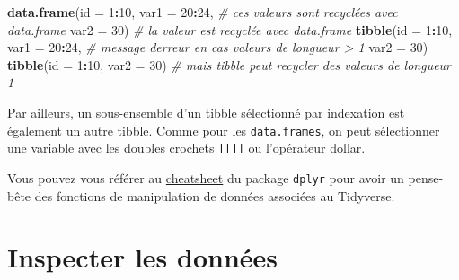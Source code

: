 \documentclass[
]{book}
\newenvironment{Shaded}{\begin{snugshade}}{\end{snugshade}}
\newcommand{\AttributeTok}[1]{\textcolor[rgb]{0.13,0.29,0.53}{#1}}
\newcommand{\CommentTok}[1]{\textcolor[rgb]{0.56,0.35,0.01}{\textit{#1}}}
\newcommand{\DecValTok}[1]{\textcolor[rgb]{0.00,0.00,0.81}{#1}}
\newcommand{\FunctionTok}[1]{\textcolor[rgb]{0.13,0.29,0.53}{\textbf{#1}}}
\newcommand{\NormalTok}[1]{#1}
\newcommand{\SpecialCharTok}[1]{\textcolor[rgb]{0.81,0.36,0.00}{\textbf{#1}}}
\begin{document}
\begin{Shaded}
\begin{Highlighting}[]
\FunctionTok{data.frame}\NormalTok{(}\AttributeTok{id =} \DecValTok{1}\SpecialCharTok{:}\DecValTok{10}\NormalTok{,}
           \AttributeTok{var1 =} \DecValTok{20}\SpecialCharTok{:}\DecValTok{24}\NormalTok{, }\CommentTok{\# ces valeurs sont recyclées avec data.frame}
           \AttributeTok{var2 =} \DecValTok{30}\NormalTok{) }\CommentTok{\# la valeur est recyclée avec data.frame}
\FunctionTok{tibble}\NormalTok{(}\AttributeTok{id =} \DecValTok{1}\SpecialCharTok{:}\DecValTok{10}\NormalTok{, }
       \AttributeTok{var1 =} \DecValTok{20}\SpecialCharTok{:}\DecValTok{24}\NormalTok{, }\CommentTok{\# message d\textquotesingle{}erreur en cas valeurs de longueur \textgreater{} 1}
       \AttributeTok{var2 =} \DecValTok{30}\NormalTok{)}
\FunctionTok{tibble}\NormalTok{(}\AttributeTok{id =} \DecValTok{1}\SpecialCharTok{:}\DecValTok{10}\NormalTok{, }
       \AttributeTok{var2 =} \DecValTok{30}\NormalTok{) }\CommentTok{\# mais tibble peut recycler des valeurs de longueur 1}
\end{Highlighting}
\end{Shaded}

Par ailleurs, un sous-ensemble d'un tibble sélectionné par indexation est également un autre tibble. Comme pour les \texttt{data.frames}, on peut sélectionner une variable avec les doubles crochets \texttt{{[}{[}{]}{]}} ou l'opérateur dollar.

\begin{Shaded}
\end{Shaded}

Vous pouvez vous référer au \href{https://github.com/rstudio/cheatsheets/blob/main/data-transformation.pdf}{cheatsheet} du package \texttt{dplyr} pour avoir un pense-bête des fonctions de manipulation de données associées au Tidyverse.

\section{Inspecter les données}\label{inspecter-les-donnuxe9es}
\end{document}
